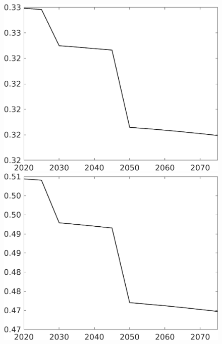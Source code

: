 \begin{figure}[h!!]
\begin{minipage}[]{0.32\textwidth}
\end{minipage}
\begin{minipage}[]{0.32\textwidth}
	\includegraphics[width=1\textwidth]{../../codding_model/own_basedOnFried/optimalPol_elastS_DisuSci/figures/all_1705/Single_OPT_T_NoTaus_hl_spillover0_sep1_BN0_ineq0_etaa0.79.png}
\end{minipage}
\begin{minipage}[]{0.32\textwidth}
	\includegraphics[width=1\textwidth]{../../codding_model/own_basedOnFried/optimalPol_elastS_DisuSci/figures/all_1705/Single_OPT_T_NoTaus_hh_spillover0_sep1_BN0_ineq0_etaa0.79.png}

\end{minipage}
\end{figure}

